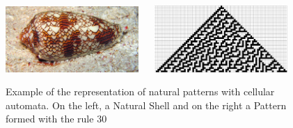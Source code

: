 \begin{figure}
        \centering
                \includegraphics[width=0.45\textwidth]{img/Theory/Cellular_A/shell.jpeg}
          ~~
                \includegraphics[width=0.45\textwidth]{img/Theory/Cellular_A/Rule30.png}
        \caption{Example of the representation of natural patterns with cellular automata. On the left, a Natural Shell \cite{Shiffman2012} and on the right a Pattern formed with the rule 30}
		\label{fig:CArule30shell}
\end{figure}



